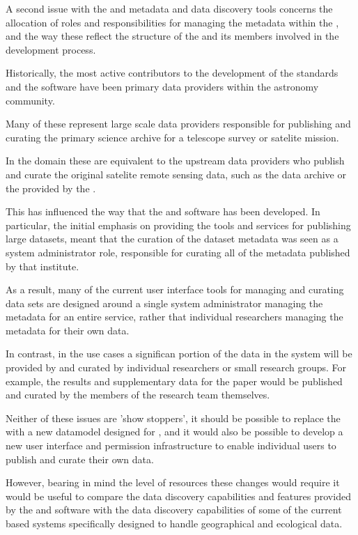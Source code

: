 \documentclass{article}
\begin{document}
A second issue with the \cite{ivoa} and \cite{astro} metadata \cite{ivoa.reg} and
data discovery tools concerns the allocation of roles and responsibilities for
managing the metadata within the \cite{ivoa.reg}, and the way these reflect the
structure of the \cite{ivoa} and its members involved in the development process.

Historically, the most active contributors to the development of the \cite{ivoa}
standards and the \cite{astro} software have been primary data providers within
the astronomy community.

Many of these represent large scale data providers responsible for publishing and
curating the primary science archive for a telescope survey or satelite mission.

In the \cite{trop} domain these are equivalent to the upstream data providers who publish
and curate the original satelite remote sensing data, such as the 
data archive or the  provided by the \cite{usgs}.

This has influenced the way that the \cite{ivoa} and \cite{astro} software has
been developed. In particular, the initial emphasis on providing the tools and
services for publishing large datasets, meant that the curation of the dataset
metadata was seen as a system administrator role, responsible for curating all of
the metadata published by that institute.

As a result, many of the current user interface tools for managing and curating data sets
are designed around a single system administrator managing the metadata for an entire
service, rather that individual researchers managing the metadata for their own data.

In contrast, in the \cite{trop} use cases a significan portion of the data in the system
will be provided by and curated by individual researchers or small research groups.
For example, the results and supplementary data for the \cite{mitchard-2014} paper would
be published and curated by the members of the research team themselves.

Neither of these issues are 'show stoppers', it should be possible to replace the \cite{ivoa}
\cite{ivoa.obscore} with a new datamodel designed for \cite{trop}, and it would also be possible
to develop a new user interface and permission infrastructure to enable individual users
to publish and curate their own data.

However, bearing in mind the level of resources these changes would require it would be useful
to compare the data discovery capabilities and features provided by the \cite{ivoa} and
\cite{astro} software with the data discovery capabilities of some of the current \cite{gis}
based systems specifically designed to handle geographical and ecological data.
\end{document}
